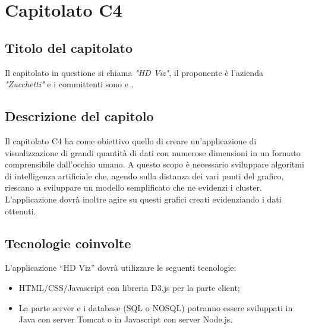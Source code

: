 
\section{Capitolato C4}
\subsection{Titolo del capitolato}
Il capitolato in questione si chiama \textit{"HD Viz"}, il proponente \`e l'azienda \textit{"Zucchetti"} e i committenti sono \VT{} e \CR{}.

\subsection{Descrizione del capitolo}
Il capitolato C4 ha come obiettivo quello di creare un'applicazione di visualizzazione di grandi quantità di dati con numerose dimensioni in un formato comprensibile dall'occhio umano. A questo scopo è necessario sviluppare algoritmi di intelligenza artificiale che, agendo sulla distanza dei vari punti del grafico, riescano a sviluppare un modello semplificato che ne evidenzi i cluster. %
L'applicazione dovrà inoltre agire su questi grafici creati evidenziando i dati ottenuti.

\subsection{Tecnologie coinvolte}
L'applicazione “HD Viz” dovrà utilizzare le seguenti tecnologie:
\begin{itemize}
\item HTML/CSS/Javascript con libreria D3.js per la parte client;
\item La parte server e i database (SQL o NOSQL) potranno essere sviluppati in Java con server Tomcat o in Javascript con server Node.js.
\end{itemize}

